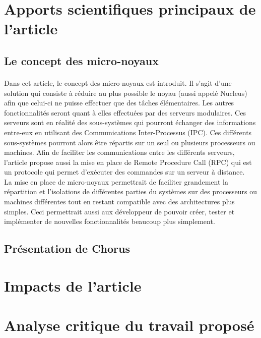 \documentclass[a4paper, 12pt]{article}
\begin{document}
\clearpage 
\section{Apports scientifiques principaux de l’article}
\subsection{Le concept des micro-noyaux}
\paragraph{}

Dans cet article, le concept des micro-noyaux est introduit. Il s'agit d'une solution qui consiste à réduire au plus possible le noyau (aussi appelé Nucleus) afin que celui-ci ne puisse effectuer que des tâches élémentaires. Les autres fonctionnalités seront quant à elles effectuées par des serveurs modulaires. Ces serveurs sont en réalité des sous-systèmes qui pourront échanger des informations entre-eux en utilisant des Communications Inter-Processus (IPC). Ces différents sous-systèmes pourront alors être répartis sur un seul ou plusieurs processeurs ou machines. Afin de faciliter les communications entre les différents serveurs, l'article propose aussi la mise en place de Remote Procedure Call (RPC) qui est un protocole qui permet d'exécuter des commandes sur un serveur à distance. \\
La mise en place de micro-noyaux permettrait de faciliter grandement la répartition et l'isolations de différentes parties du systèmes sur des processeurs ou machines différentes tout en restant compatible avec des architectures plus simples. Ceci permettrait aussi aux développeur de pouvoir créer, tester et implémenter de nouvelles fonctionnalités beaucoup plus simplement.

\subsection{Présentation de Chorus}


\clearpage 
\section{Impacts de l'article}

\clearpage 
\section{Analyse critique du travail proposé}
\end{document}

